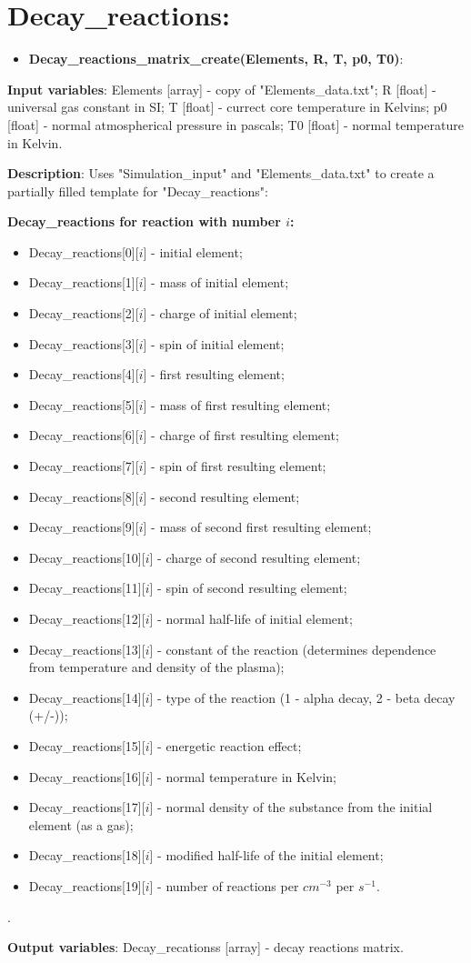 \documentclass[a4paper,12pt]{article}
\newcommand{\namefunction}[4]{
  \begin{itemize}
    \item \textbf{#1}:
  \end{itemize}
  
  \textbf{Input variables}: #2.
  
  \textbf{Description}: #3.
  
  \textbf{Output variables}: #4.
}
\begin{document}
\section{Decay\_reactions:}

\vspace{1em}

\namefunction{Decay\_reactions\_matrix\_create(Elements, R, T, p0, T0)}{Elements [array] - copy of "Elements\_data.txt"; R [float] - universal gas constant in SI; T [float] - currect core temperature in Kelvins; p0 [float] - normal atmospherical pressure in pascals; T0 [float] - normal temperature in Kelvin}{Uses "Simulation\_input" and "Elements\_data.txt" to create a partially filled template for "Decay\_reactions":

\textbf{Decay\_reactions for reaction with number $i$:}
\begin{itemize}
	\item Decay\_reactions[0][$i$] - initial element;
	\item Decay\_reactions[1][$i$] - mass of initial element;
	\item Decay\_reactions[2][$i$] - charge of initial element;
	\item Decay\_reactions[3][$i$] - spin of initial element;
	\item Decay\_reactions[4][$i$] - first resulting element;
	\item Decay\_reactions[5][$i$] - mass of first resulting element;
	\item Decay\_reactions[6][$i$] - charge of first resulting element;
	\item Decay\_reactions[7][$i$] - spin of first resulting element;
	\item Decay\_reactions[8][$i$] - second resulting element;
	\item Decay\_reactions[9][$i$] - mass of second first resulting element;
	\item Decay\_reactions[10][$i$] - charge of second resulting element;
	\item Decay\_reactions[11][$i$] - spin of second resulting element;
	\item Decay\_reactions[12][$i$] - normal half-life of initial element;	
	\item Decay\_reactions[13][$i$] - constant of the reaction (determines dependence from temperature and density of the plasma);
	\item Decay\_reactions[14][$i$] - type of the reaction (1 - alpha decay, 2 - beta decay (+/-));
	\item Decay\_reactions[15][$i$] - energetic reaction effect;
	\item Decay\_reactions[16][$i$] - normal temperature in Kelvin;
	\item Decay\_reactions[17][$i$] - normal density of the substance from the initial element (as a gas);
	\item Decay\_reactions[18][$i$] - modified half-life of the initial element;
	\item Decay\_reactions[19][$i$] - number of reactions per $cm^{-3}$ per $s^{-1}$.
\end{itemize}

}{Decay\_recationss [array] - decay reactions matrix}
\end{document}
